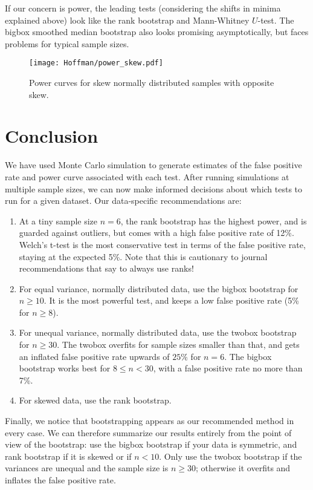 \documentclass[10pt]{article} %
\begin{document}
If our concern is power, the leading tests (considering the shifts in minima explained above) look like the rank bootstrap and Mann-Whitney $U$-test. The bigbox smoothed median bootstrap also looks promising asymptotically, but faces problems for typical sample sizes.


\begin{figure}
  \texttt{[image: Hoffman/power\_skew.pdf]}
  \caption{Power curves for skew normally distributed samples with opposite skew.}
  \label{fig:skew}
\end{figure}



\section{Conclusion}
We have used Monte Carlo simulation to generate estimates of the false positive rate and power curve associated with each test. After running simulations at multiple sample sizes, we can now make informed decisions about which tests to run for a given dataset. Our data-specific recommendations are:

\begin{enumerate}
\item At a tiny sample size $n=6$, the rank bootstrap has the highest power, and is guarded against outliers, but comes with a high false positive rate of 12\%. Welch's t-test is the most conservative test in terms of the false positive rate, staying at the expected 5\%.  Note that this is cautionary to journal recommendations that say to always use ranks! 
\item For equal variance, normally distributed data, use the bigbox bootstrap for $n\geq10$. It is the most powerful test, and keeps a low false positive rate (5\% for $n\geq8$).
\item For unequal variance, normally distributed data, use the twobox bootstrap for $n\geq30$. The twobox overfits for sample sizes smaller than that, and gets an inflated false positive rate upwards of $25\%$ for $n=6$. The bigbox bootstrap works best for $8\leq n <30$, with a false positive rate no more than 7\%. 
\item For skewed data, use the rank bootstrap.
\end{enumerate}

\noindent Finally, we notice that bootstrapping appears as our recommended method in every case. We can therefore summarize our results entirely from the point of view of the bootstrap: use the bigbox bootstrap if your data is symmetric, and rank bootstrap if it is skewed or if $n<10$. Only use the twobox bootstrap if the variances are unequal and the sample size is $n\geq 30$; otherwise it overfits and inflates the false positive rate. 
\end{document}
